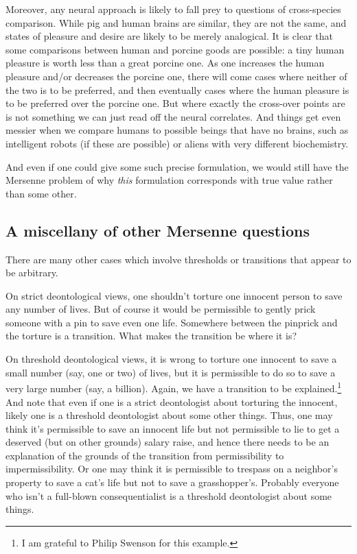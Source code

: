 Moreover, any neural approach is likely to fall prey to questions of cross-species comparison. While pig and human brains are
similar, they are not the same, and states of pleasure and desire are likely to be merely analogical. It is clear that some
comparisons between human and porcine goods are possible: a tiny human pleasure is worth less than a great porcine one. As one
increases the human pleasure and/or decreases the porcine one, there will come cases where neither of the two is to be
preferred, and then eventually cases where the human pleasure is to be preferred over the porcine one. But where exactly
the cross-over points are is not something we can just read off the neural correlates. And things get even messier when we
compare humans to possible beings that have no brains, such as intelligent robots (if these are possible) or aliens with very 
different biochemistry.

And even if one could give some such precise formulation, we would still have
the Mersenne problem of why \textit{this} formulation corresponds with true value rather than some other. 

\subsection{A miscellany of other Mersenne questions}
There are many other cases which involve thresholds or transitions that appear to be arbitrary.

On strict deontological views, one shouldn't torture one innocent person to save any number of lives. But of course
it would be permissible to gently prick someone with a pin to save even one life. Somewhere between the pinprick
and the torture is a transition. What makes the transition be where it is?

On threshold deontological views, it is wrong to torture one innocent to save a small number (say, one or two) of lives,
but it is permissible to do so to save a very large number (say, a billion). Again, we have a transition to be 
explained.\footnote{I am grateful to Philip Swenson for this example.} And note that even if one is a strict deontologist
about torturing the innocent, likely one is a threshold deontologist about some other things. Thus, one may think it's
permissible to save an innocent life but not permissible to lie to get a deserved (but on other grounds) salary raise,
and hence there needs to be an explanation of the grounds of the transition from permissibility to impermissibility. Or
one may think it is permissible to trespass on a neighbor's property to save a cat's life but not to save a grasshopper's.
Probably everyone who isn't a full-blown consequentialist is a threshold deontologist about some things.

